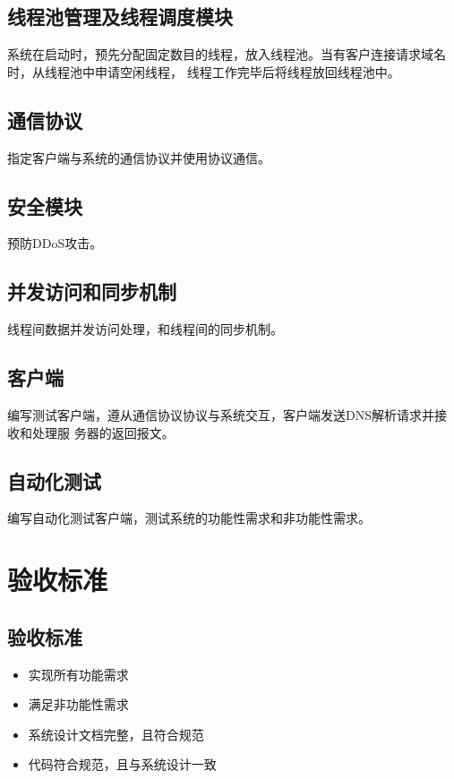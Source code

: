 \documentclass[12pt, a4paper, titlepage]{article}
\begin{document}
\subsection{线程池管理及线程调度模块}
系统在启动时，预先分配固定数目的线程，放入线程池。当有客户连接请求域名时，从线程池中申请空闲线程，
线程工作完毕后将线程放回线程池中。
\subsection{通信协议}
指定客户端与系统的通信协议并使用协议通信。
\subsection{安全模块}
预防DDoS攻击。
\subsection{并发访问和同步机制}
线程间数据并发访问处理，和线程间的同步机制。
\subsection{客户端}
编写测试客户端，遵从通信协议协议与系统交互，客户端发送DNS解析请求并接收和处理服
务器的返回报文。
\subsection{自动化测试}
编写自动化测试客户端，测试系统的功能性需求和非功能性需求。

\section{验收标准}
\subsection{验收标准}
	\begin{itemize}
		\item{实现所有功能需求 }
		\item{满足非功能性需求 }
	  	\item{系统设计文档完整，且符合规范 }
	  	\item{代码符合规范，且与系统设计一致}
	\end{itemize}
\end{document}
